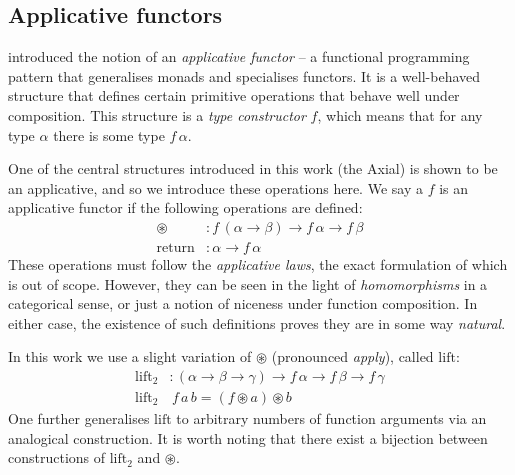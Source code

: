 \subsection{Applicative functors}

\textcite{mcbride2008applicative} introduced the notion of an \textit{applicative functor} -- a functional programming pattern that generalises monads and specialises functors. It is a well-behaved structure that defines certain primitive operations that behave well under composition. This structure is a \textit{type constructor} $f$, which means that for any type $\alpha$ there is some type $f\,\alpha$.

One of the central structures introduced in this work (the Axial) is shown to be an applicative, and so we introduce these operations here. We say a $f$ is an applicative functor if the following operations are defined:
\begin{align*}
\circledast &: f\,(\alpha \to \beta) \to f\,\alpha \to f\,\beta \\
\mathrm{return} &: \alpha \to f\,\alpha
\end{align*}
These operations must follow the \textit{applicative laws}, the exact formulation of which is out of scope. However, they can be seen in the light of \textit{homomorphisms} in a categorical sense, or just a notion of niceness under function composition. In either case, the existence of such definitions proves they are in some way \textit{natural}. 

In this work we use a slight variation of $\circledast$ (pronounced \textit{apply}), called $\mathrm{lift}$:
\begin{align*}
\mathrm{lift}_2& : (\alpha \to \beta \to \gamma) \to f\,\alpha \to f\,\beta \to f\,\gamma \\ 
\mathrm{lift}_2&\,f\,a\,b = (f \circledast a) \circledast b
\end{align*}
One further generalises $\mathrm{lift}$ to arbitrary numbers of function arguments via an analogical construction. It is worth noting that there exist a bijection between constructions of $\mathrm{lift}_2$ and $\circledast$.

